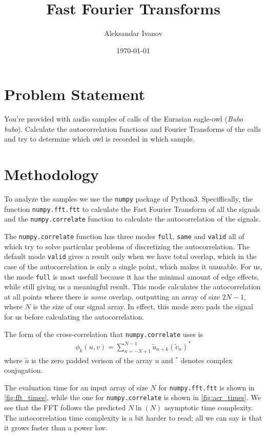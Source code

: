 \documentclass[10pt,a4paper,twocolumn]{article}
\begin{document}
\title{Fast Fourier Transforms}
\author{Aleksandar Ivanov}
\date{\today}
\maketitle

\section{Problem Statement}

You're provided with audio samples of calls of the Eurasian eagle-owl (\emph{Bubo bubo}). Calculate the autocorrelation functions and Fourier Transforms of the calls and try to determine which owl is recorded in which sample.


\section{Methodology}

To analyze the samples we use the \texttt{numpy} package of Python3. Speciffically, the function \texttt{numpy.fft.ftt} to calculate the Fast Fourier Transform \cite{Cooley1965AnAF} of all the signals and the \texttt{numpy.correlate} \cite{npcor} function to calculate the autocorrelation of the signals.

The \texttt{numpy.correlate} function has three modes \texttt{full}, \texttt{same} and \texttt{valid} all of which try to solve particular problems of discretizing the autocorrelation. The default mode \texttt{valid} gives a result only when we have total overlap, which in the case of the autocorrelation is only a single point, which makes it unusable. For us, the mode \texttt{full} is most usefull because it has the minimal amount of edge effects, while still giving us a meaningful result. This mode calculates the autocorrelation at all points where there is \emph{some} overlap, outputting an array of size $2N - 1$, where $N$ is the size of our signal array. In effect, this mode zero pads the signal \cite{zpad} for us before calculating the autocorrelation.

The form of the cross-correlation that \texttt{numpy.correlate} uses is
%
\begin{align}
\phi_k(u, v) = \sum_{n=-N+1}^{N-1} \tilde{u}_{n+k} (\tilde{v}_{n})^{*}
\end{align}
%
where $\tilde{u}$ is the zero padded verison of the array $u$ and $^*$ denotes complex conjugation.

The evaluation time for an input array of size $N$ for \texttt{numpy.fft.ftt} is shown in \cref{fig:fft_times}, while the one for \texttt{numpy.correlate} is shown in \cref{fig:acr_times}. We see that the FFT follows the predicted $N \ln(N)$ asymptotic time complexity. \cite{nlnn}The autocorrelation time complexity is a bit harder to read; all we can say is that it grows faster than a power law.
\end{document}
